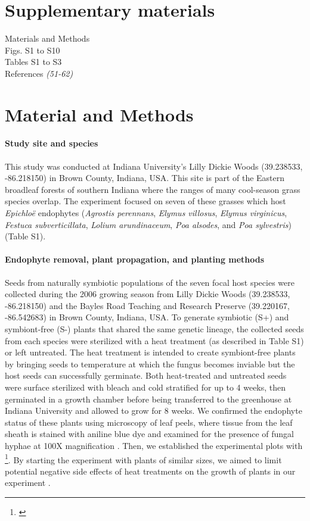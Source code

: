 \documentclass[12pt]{article}
\newcommand{\tom}[2]{{\color{red}{#1}}\footnote{\textit{\color{red}{#2}}}}
\begin{document}
\section*{Supplementary materials}
Materials and Methods\\


Figs. S1 to S10\\
Tables S1 to S3\\
References \textit{(51-62)}


\section*{Material and Methods}
\paragraph*{Study site and species}
This study was conducted at Indiana University's Lilly Dickie Woods (39.238533, -86.218150) in Brown County, Indiana, USA. 
This site is part of the Eastern broadleaf forests of southern Indiana where the ranges of many cool-season grass species overlap. 
The experiment focused on seven of these grasses which host \emph{Epichlo\"e} endophytes (\emph{Agrostis perennans}, \emph{Elymus villosus}, \emph{Elymus virginicus}, \emph{Festuca subverticillata}, \emph{Lolium arundinaceum}, \emph{Poa alsodes}, and \emph{Poa sylvestris}) (Table S1). 


\paragraph*{Endophyte removal, plant propagation, and planting methods}
Seeds from naturally symbiotic populations of the seven focal host species were collected during the 2006 growing season from Lilly Dickie Woods (39.238533, -86.218150) and the Bayles Road Teaching and Research Preserve (39.220167, -86.542683) in Brown County, Indiana, USA. 
To generate symbiotic (S+) and symbiont-free (S-) plants that shared the same genetic lineage, the collected seeds from each species were sterilized with a heat treatment (as described in Table S1) or left untreated. 
The heat treatment is intended to create symbiont-free plants by bringing seeds to temperature at which the fungus becomes inviable but the host seeds can successfully germinate.
Both heat-treated and untreated seeds were surface sterilized with bleach and cold stratified for {\color{red}up to 4 weeks}, then germinated in a growth chamber before being transferred to the greenhouse at Indiana University and allowed to grow for {\color{red}8 weeks}. 
We confirmed the endophyte status of these plants using microscopy of leaf peels, where tissue from the leaf sheath is stained with aniline blue dye and examined for the presence of fungal hyphae at 100X magnification \cite{bacon2018stains}. 
Then, we established the experimental plots with \tom{vegetatively propagated clones of similar sizes from the plants}{not sure this happened}. 
By starting the experiment with plants of similar sizes, we aimed to limit potential negative side effects of heat treatments on the growth of plants in our experiment \cite{rudgers2009benefits}.
\end{document}
